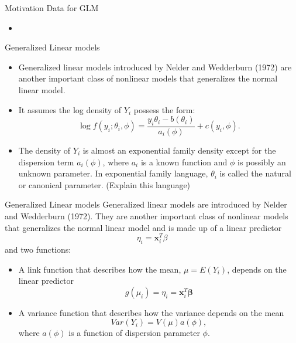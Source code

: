 \documentclass{beamer}
\begin{document}
     \begin{frame}{Motivation Data for GLM}
        \begin{itemize}
            \item 
        \end{itemize}
    \end{frame}
    
    
    \begin{frame}{Generalized Linear models}
        \begin{itemize}
            \item Generalized linear models introduced by Nelder and Wedderburn (1972) are another
important class of nonlinear models that generalizes the normal linear model.
            
            \item It assumes the log density of $Y_{i}$ possess the form:
            \begin{equation}
                \log f(y_{i};\theta_{i}, \phi) = \frac{y_{i}\theta_{i}-b(\theta_{i})}{a_{i}(\phi)} + c(y_{i}, \phi). \label{eq: LikeexpoF}
            \end{equation}
            \item The density of $Y_{i}$ is almost an exponential family density except for the dispersion
term $a_{i}(\phi)$, where $a_{i}$ is a known function and $\phi$ is possibly an unknown parameter. In exponential family language, $\theta_{i}$ is called the natural or canonical parameter. (Explain this language)
        \end{itemize}
    \end{frame}
    
    
      \begin{frame}{Generalized Linear models}
      Generalized linear models are introduced by Nelder and Wedderburn (1972). They are another important class of nonlinear models that generalizes the normal linear model and is made up of a linear predictor $$\eta_{i} = \mathbf{x}^{T}_{i}\beta$$ and two functions:
        \begin{itemize}
        \item A link function that describes how the mean, $\mu = E(Y_{i})$,  depends on the linear predictor $$ g(\mu_{i}) = \eta_{i} = \mathbf{x}^{T}_{i}\boldsymbol{\beta}$$
        \item A variance function that describes how the variance depends on the mean
        $$Var(Y_{i}) = V(\mu)a(\phi),$$
        where $a(\phi)$ is a function of dispersion parameter $\phi$. 
        \end{itemize}
    \end{frame}
    
\end{document}
